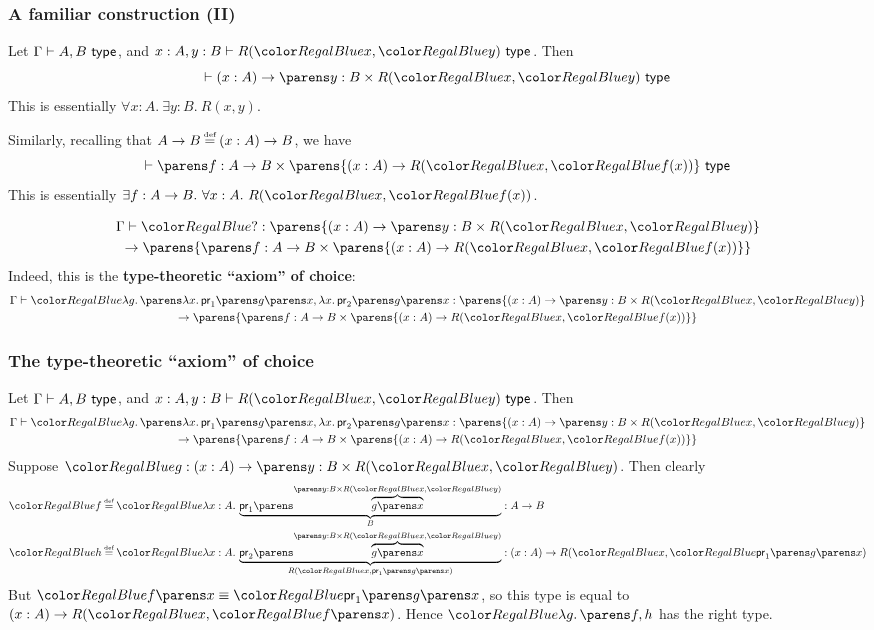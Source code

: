\documentclass[handout]{beamer} %
\begin{document}
\begin{frame}
  \frametitle{A familiar construction (II)}
  
  Let $\IsTy{A, B}[]$, and $\IsTy[x : A, y : B]{R(\Tm{x}, \Tm{y})}[]$. Then
  \[
    \IsTy[]{\Fn{x}{A}{\DSum{y}{B}{R(\Tm{x}, \Tm{y})}}}[]
  \]
  This is essentially $\forall x : A.\ \exists y : B.\ R(x, y)$.
  
  Similarly, recalling that $A \to B \defeq \Fn{x}{A}{B}$, we have
  \[
    \IsTy[]{\DSum{f}{A \to B}{\parens{\Fn{x}{A}{R(\Tm{x}, \Tm{f(x)})}}}}[] 
  \]
  This is essentially $\exists f : A \to B.\ \forall x : A.\ R(\Tm{x}, \Tm{f(x)})$.
  
  \begin{multline*}
    \IsTm{?}{
      \parens{\Fn{x}{A}{\DSum{y}{B}{R(\Tm{x}, \Tm{y})}}} \\ 
      \to \parens{ \DSum{f}{A \to B}{\parens{\Fn{x}{A}{R(\Tm{x}, \Tm{f(x)})}}} }
    } 
  \end{multline*}
  \pause
  Indeed, this is the \textbf{type-theoretic ``axiom'' of choice}:
  \begin{multline*}
    \IsTm{
      \Lam{g}{
        \Pair{
          \Lam{x}{\Proj[1]{\App{g}{x}}}
        }{
          \Lam{x}{\Proj[2]{\App{g}{x}}}
        }
      }
    }{
      \parens{\Fn{x}{A}{\DSum{y}{B}{R(\Tm{x}, \Tm{y})}}} \\ 
      \to \parens{ \DSum{f}{A \to B}{\parens{\Fn{x}{A}{R(\Tm{x}, \Tm{f(x)})}}} }
    } 
  \end{multline*}
\end{frame}

\begin{frame}
  \frametitle{The type-theoretic ``axiom'' of choice}
  
  Let $\IsTy{A, B}[]$, and $\IsTy[x : A, y : B]{R(\Tm{x}, \Tm{y})}[]$. Then
  \begin{multline*}
    \IsTm{
      \Lam{g}{
        \Pair{
          \Lam{x}{\Proj[1]{\App{g}{x}}}
        }{
          \Lam{x}{\Proj[2]{\App{g}{x}}}
        }
      }
    }{
      \parens{\Fn{x}{A}{\DSum{y}{B}{R(\Tm{x}, \Tm{y})}}} \\ 
      \to \parens{ \DSum{f}{A \to B}{\parens{\Fn{x}{A}{R(\Tm{x}, \Tm{f(x)})}}} }
    } 
  \end{multline*}
  Suppose $\Tm{g} : \Fn{x}{A}{\DSum{y}{B}{R(\Tm{x}, \Tm{y})}}$. Then clearly
  \begin{align*}
    \Tm{f} &\defeq \Tm{
      \Lam{x}[A]{
        \underbrace{\Proj[1]{\overbrace{\App{g}{x}}^{\DSum{y}{B}{R(\Tm{x}, \Tm{y})}}}}_{B}
      }
    } : A \to B 
    \\
    \Tm{h} &\defeq \Tm{
      \Lam{x}[A]{
        \underbrace{\Proj[2]{\overbrace{\App{g}{x}}^{\DSum{y}{B}{R(\Tm{x}, \Tm{y})}}}}_{
          R(\Tm{x}, \Proj[1]{\App{g}{x}})
        }
      } 
    } : \Fn{x}{A}{R(\Tm{x}, \Tm{\Proj[1]{\App{g}{x}}})}
  \end{align*}
  But $\Tm{\App{f}{x}} \equiv \Tm{\Proj[1]{\App{g}{x}}}$, so this type is equal
  to $\Fn{x}{A}{R(\Tm{x}, \Tm{\App{f}{x}})}$. Hence $\Tm{\Lam{g}{\Pair{f}{h}}}$ has the
  right type.
  
\end{frame}
\end{document}
